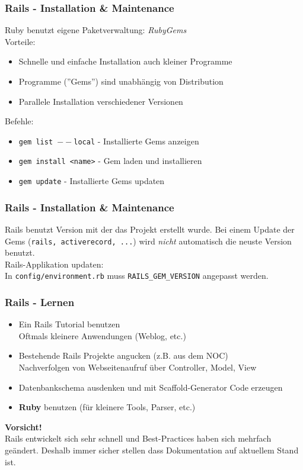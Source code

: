 \begin{frame}
  \frametitle{Rails - Installation \& Maintenance}
  Ruby benutzt eigene Paketverwaltung: \emph{RubyGems} \\
  \pause
  \vspace{0.3cm}
  Vorteile:
  \begin{itemize}
    \item Schnelle und einfache Installation auch kleiner Programme
    \item Programme (''Gems'') sind unabhängig von Distribution
    \item Parallele Installation verschiedener Versionen
  \end{itemize}
  \pause
  \vspace{0.3cm}
  Befehle:
  \begin{itemize}
    \item {\tt gem list $--$local} - Installierte Gems anzeigen
    \item {\tt gem install <name>} - Gem laden und installieren
    \item {\tt gem update} - Installierte Gems updaten
  \end{itemize}
\end{frame}

\begin{frame}
  \frametitle{Rails - Installation \& Maintenance}
  Rails benutzt Version mit der das Projekt erstellt wurde. Bei einem
  Update der Gems ({\tt rails, activerecord, ...}) wird \emph{nicht} automatisch
  die neuste Version benutzt. \\
  \vspace{0.3cm}
  Rails-Applikation updaten: \\
  \vspace{0.2cm}
  In {\tt config/environment.rb} muss {\tt RAILS\_GEM\_VERSION} angepasst werden.
\end{frame}

\begin{frame}
  \frametitle{Rails - Lernen}
  \begin{itemize}
    \item Ein Rails Tutorial benutzen \\ Oftmals kleinere Anwendungen (Weblog, etc.)
    \item Bestehende Rails Projekte angucken (z.B. aus dem NOC) \\ Nachverfolgen von Webseitenaufruf über Controller, Model, View
    \item Datenbankschema ausdenken und mit Scaffold-Generator Code erzeugen
    \item {\bf Ruby} benutzen (für kleinere Tools, Parser, etc.)
  \end{itemize}
  \pause
  \vspace{0.5cm}
  {\bf Vorsicht!}\\
  Rails entwickelt sich sehr schnell und Best-Practices haben sich mehrfach geändert. Deshalb immer 
  sicher stellen dass Dokumentation auf aktuellem Stand ist.
\end{frame}

